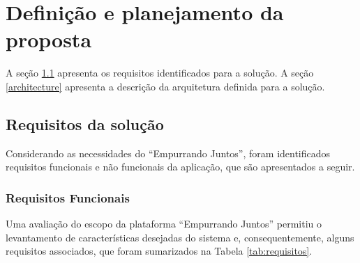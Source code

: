 \chapter{Definição e planejamento da proposta} \label{cap:proposta}

 A seção \ref{requirements} apresenta os requisitos identificados para a solução.
  A seção \ref{architecture} apresenta a descrição da arquitetura definida para a solução.

\section{Requisitos da solução} \label{requirements}

    Considerando as necessidades do ``Empurrando Juntos'',
    foram identificados requisitos funcionais e não funcionais da aplicação,
    que são apresentados a seguir.

    \subsection*{Requisitos Funcionais} \label{functional_requirements}

    Uma avaliação do escopo da plataforma ``Empurrando Juntos'' permitiu o levantamento de características desejadas do sistema e,
    consequentemente, alguns requisitos associados, que foram sumarizados na Tabela \ref{tab:requisitos}.

